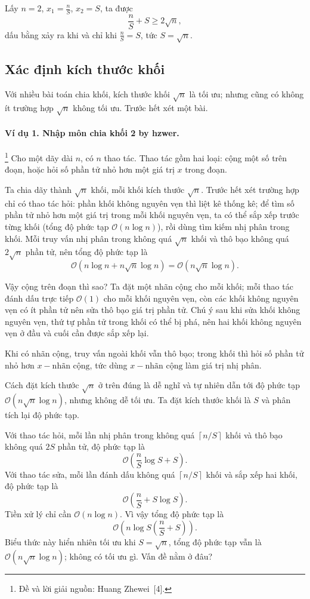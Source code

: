 \documentclass[11pt]{article}
\newcommand{\Oh}{\mathcal{O}}
\begin{document}
Lấy \(n=2\), \(x_1=\frac nS\), \(x_2=S\), ta được
\[
  \frac nS+S\ge 2\sqrt n,
\]
dấu bằng xảy ra khi và chỉ khi \(\frac nS=S\), tức \(S=\sqrt n\).

\subsection{Xác định kích thước khối}

Với nhiều bài toán chia khối, kích thước khối \(\sqrt n\) là tối ưu; nhưng
cũng có không ít trường hợp \(\sqrt n\) không tối ưu. Trước hết xét một bài.

\paragraph{Ví dụ 1. Nhập môn chia khối 2 by hzwer.}
\footnote{Đề và lời giải nguồn: Huang Zhewei~[4].}
Cho một dãy dài \(n\), có \(n\) thao tác. Thao tác gồm hai loại: cộng một số
trên đoạn, hoặc hỏi số phần tử nhỏ hơn một giá trị \(x\) trong đoạn.

Ta chia dãy thành \(\sqrt n\) khối, mỗi khối kích thước \(\sqrt n\). Trước hết
xét trường hợp chỉ có thao tác hỏi: phần khối không nguyên vẹn thì liệt kê
thống kê; để tìm số phần tử nhỏ hơn một giá trị trong mỗi khối nguyên vẹn, ta
có thể sắp xếp trước từng khối (tổng độ phức tạp \(\Oh(n\log n)\)), rồi dùng
tìm kiếm nhị phân trong khối. Mỗi truy vấn nhị phân trong không quá \(\sqrt n\)
khối và thô bạo không quá \(2\sqrt n\) phần tử, nên tổng độ phức tạp là
\[
  \Oh\left(n\log n+n\sqrt n\log n\right)
  =
  \Oh\left(n\sqrt n\log n\right).
\]

Vậy cộng trên đoạn thì sao? Ta đặt một nhãn cộng cho mỗi khối; mỗi thao tác
đánh dấu trực tiếp \(\Oh(1)\) cho mỗi khối nguyên vẹn, còn các khối không
nguyên vẹn có ít phần tử nên sửa thô bạo giá trị phần tử. Chú ý sau khi sửa
khối không nguyên vẹn, thứ tự phần tử trong khối có thể bị phá, nên hai khối
không nguyên vẹn ở đầu và cuối cần được sắp xếp lại.

Khi có nhãn cộng, truy vấn ngoài khối vẫn thô bạo; trong khối thì hỏi số phần
tử nhỏ hơn \(x-\text{nhãn cộng}\), tức dùng \(x-\text{nhãn cộng}\) làm giá trị
nhị phân.

Cách đặt kích thước \(\sqrt n\) ở trên đúng là dễ nghĩ và tự nhiên dẫn tới độ
phức tạp \(\Oh(n\sqrt n\log n)\), nhưng không dễ tối ưu. Ta đặt kích thước
khối là \(S\) và phân tích lại độ phức tạp.

Với thao tác hỏi, mỗi lần nhị phân trong không quá \(\left\lceil n/S\right\rceil\)
khối và thô bạo không quá \(2S\) phần tử, độ phức tạp là
\[
  \Oh\left(\frac nS\log S+S\right).
\]
Với thao tác sửa, mỗi lần đánh dấu không quá \(\left\lceil n/S\right\rceil\)
khối và sắp xếp hai khối, độ phức tạp là
\[
  \Oh\left(\frac nS+S\log S\right).
\]
Tiền xử lý chỉ cần \(\Oh(n\log n)\). Vì vậy tổng độ phức tạp là
\[
  \Oh\left(n\log S\left(\frac nS+S\right)\right).
\]
Biểu thức này hiển nhiên tối ưu khi \(S=\sqrt n\), tổng độ phức tạp vẫn là
\(\Oh(n\sqrt n\log n)\); không có tối ưu gì. Vấn đề nằm ở đâu?
\end{document}
